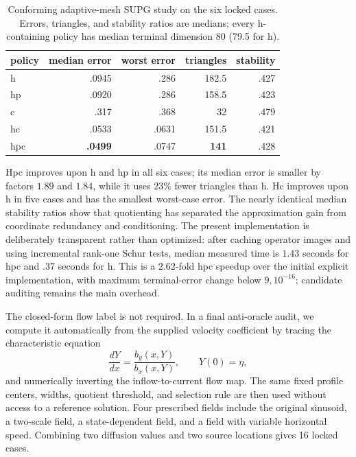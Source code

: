 \documentclass[11pt]{article}
\numberwithin{algorithm}{section}
\theoremstyle{definition}\newtheorem{definition}[theorem]{Definition}
\theoremstyle{remark}\newtheorem{remark}[theorem]{Remark}
\begin{document}
\begin{table}[t]
\centering
\caption{Conforming adaptive-mesh SUPG study on the six locked cases.  Errors,
triangles, and stability ratios are medians; every h-containing policy has
median terminal dimension 80 (79.5 for h).}
\label{tab:adaptive-supg-mesh}
\begin{tabular}{lrrrr}
\toprule
policy & median error & worst error & triangles & stability\\
\midrule
h & .0945 & .286 & 182.5 & .427\\
hp & .0920 & .286 & 158.5 & .423\\
c & .317 & .368 & 32 & .479\\
hc & .0533 & .0631 & 151.5 & .421\\
hpc & \textbf{.0499} & .0747 & \textbf{141} & .428\\
\bottomrule
\end{tabular}
\end{table}

Hpc improves upon h and hp in all six cases; its median error is smaller by
factors $1.89$ and $1.84$, while it uses $23\%$ fewer triangles than h.  Hc
improves upon h in five cases and has the smallest worst-case error.  The
nearly identical median stability ratios show that quotienting has separated
the approximation gain from coordinate redundancy and conditioning.  The
present implementation is deliberately transparent rather than optimized:
after caching operator images and using incremental rank-one Schur tests,
median measured time is $1.43$ seconds for hpc and $.37$ seconds for h.  This is
a $2.62$-fold hpc speedup over the initial explicit implementation, with maximum
terminal-error change below $9,10^{-16}$; candidate auditing remains the main
overhead.

The closed-form flow label is not required.  In a final anti-oracle audit, we
compute it automatically from the supplied velocity coefficient by tracing
the characteristic equation
\[
 \frac{dY}{dx}=\frac{b_y(x,Y)}{b_x(x,Y)},\qquad Y(0)=\eta,
\]
and numerically inverting the inflow-to-current flow map.  The same fixed
profile centers, widths, quotient threshold, and selection rule are then used
without access to a reference solution.  Four prescribed fields include the
original sinusoid, a two-scale field, a state-dependent field, and a field with
variable horizontal speed.  Combining two diffusion values and two source
locations gives 16 locked cases.
\end{document}
